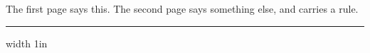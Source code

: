 \hsize=4in
The first page says this.
\vfill\eject
The second page says something else, and carries a rule.
\hrule width 1in
\bye
